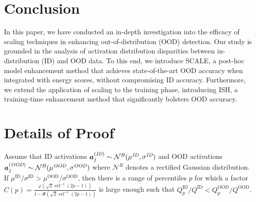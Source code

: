 \documentclass{article} %
\theoremstyle{plain}
\newenvironment{manualtheorem}[1]{%
  \renewcommand\themanualtheoreminner{#1}%
  \manualtheoreminner
}{\endmanualtheoreminner}
\newcommand{\pF}{\va}     %
\begin{document}
\section{Conclusion}

In this paper, we have conducted an in-depth investigation into the efficacy of scaling techniques in enhancing out-of-distribution (OOD) detection. Our study is grounded in the analysis of activation distribution disparities between in-distribution (ID) and OOD data. To this end, we introduce SCALE, a post-hoc model enhancement method that achieves state-of-the-art OOD accuracy when integrated with energy scores, without compromising ID accuracy. Furthermore, we extend the application of scaling to the training phase, introducing ISH, a training-time enhancement method that significantly bolsters OOD accuracy. 





\appendix

\section{Details of Proof}\label{app:proof}

\begin{manualtheorem}{3.1}
\label{prop_ratio}
Assume that ID activations $\pF_j^{(\textit{ID})} \sim \mathcal{N}^{R}(\mu^{\textit{ID}}, \sigma^{\textit{ID}})$ and OOD activations $\pF_j^{(\textit{OOD})} \sim \mathcal{N}^{R}(\mu^{\textit{OOD}}, \sigma^{\textit{OOD}})$ where $\mathcal{N}^{R}$ denotes a rectified Gaussian distribution. 
If $\mu^\text{ID}/\sigma^\text{ID}>\mu^\text{OOD}/\sigma^\text{OOD}$, then there is a range of percentiles $p$ for which a factor $ C(p)=\frac{\varphi(\sqrt{2}\operatorname {erf} ^{-1}(2p-1))}{1-\Phi(\sqrt{2}\operatorname {erf} ^{-1}(2p-1))}$ is large enough such that ${Q_p^{\text{ID}}}/{Q^{\text{ID}}}<{Q_p^{\text{OOD}}}/{Q^{\text{OOD}}}$. 
\end{manualtheorem}
\end{document}
